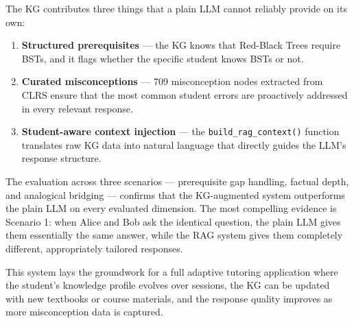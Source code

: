 \documentclass[12pt,a4paper]{article}
\begin{document}
The KG contributes three things that a plain LLM cannot reliably provide on its
own:

\begin{enumerate}
  \item \textbf{Structured prerequisites} --- the KG knows that Red-Black Trees
    require BSTs, and it flags whether the specific student knows BSTs or not.
  \item \textbf{Curated misconceptions} --- 709 misconception nodes extracted
    from CLRS ensure that the most common student errors are proactively
    addressed in every relevant response.
  \item \textbf{Student-aware context injection} --- the
    \texttt{build\_rag\_context()} function translates raw KG data into natural
    language that directly guides the LLM's response structure.
\end{enumerate}

The evaluation across three scenarios --- prerequisite gap handling, factual
depth, and analogical bridging --- confirms that the KG-augmented system
outperforms the plain LLM on every evaluated dimension. The most compelling
evidence is Scenario 1: when Alice and Bob ask the identical question, the plain
LLM gives them essentially the same answer, while the RAG system gives them
completely different, appropriately tailored responses.

This system lays the groundwork for a full adaptive tutoring application where
the student's knowledge profile evolves over sessions, the KG can be updated
with new textbooks or course materials, and the response quality improves as
more misconception data is captured.
\end{document}
